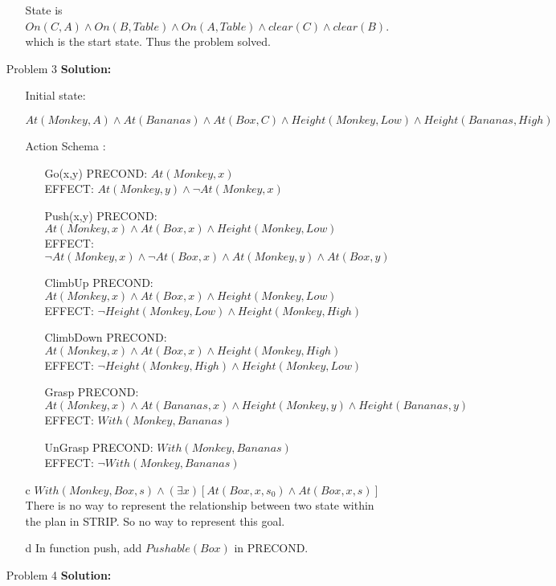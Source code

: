 \normalfont\documentclass[letterpaper,11pt]{article}
\begin{document}
\begin{enumerate}
\begin{enumerate}
			State is $On(C,A)\land On(B,Table) \land On(A,Table) \land clear(C)\land clear(B)$. which is the start state. Thus the problem solved.
	\end{enumerate}
\item[Problem 3]\textbf{Solution:}\par
\begin{enumerate}
	\item[Initial state:] \par
		$At(Monkey,A)\land At(Bananas) \land At(Box,C) \land Height(Monkey, Low) \land Height(Bananas, High)$
	\item[Action Schema]: \par
		\begin{enumerate}
			\item[Go(x,y)]
				PRECOND: $At(Monkey, x)$\\
				EFFECT: $At(Monkey, y) \land \neg At(Monkey, x)$
			\item[Push(x,y)]
				PRECOND: $At(Monkey, x) \land At(Box,x) \land Height(Monkey, Low)$\\
				EFFECT: $\neg At(Monkey, x) \land \neg At(Box,x) \land At(Monkey, y) \land At(Box,y)$
			\item[ClimbUp]
				PRECOND: $At(Monkey, x) \land At(Box,x) \land Height(Monkey, Low)$\\
				EFFECT: $\neg Height(Monkey, Low) \land Height(Monkey, High)$
			\item[ClimbDown]
				PRECOND: $At(Monkey, x) \land At(Box,x) \land Height(Monkey, High)$\\
				EFFECT: $\neg Height(Monkey, High) \land Height(Monkey, Low)$
			\item[Grasp]
				PRECOND: $At(Monkey, x) \land At(Bananas,x) \land Height(Monkey, y)\land Height(Bananas, y)$\\
				EFFECT: $With(Monkey, Bananas)$
			\item[UnGrasp]
				PRECOND: $With(Monkey, Bananas)$\\
				EFFECT: $\neg With(Monkey, Bananas)$
		\end{enumerate}
	\item[c] $With(Monkey, Box, s) \land (\exists x)[At(Box, x, s_0)\land At(Box,x,s)]$\\
	There is no way to represent the relationship between two state within the plan in STRIP. So no way to represent this goal.
	\item[d] In function push, add $Pushable(Box)$ in PRECOND.
\end{enumerate}
\item[Problem 4]\textbf{Solution:}\par

\end{enumerate}
\end{document}
